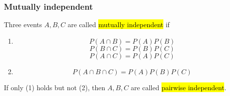 \documentclass[slidestop,compress,mathserif]{beamer}
\begin{document}
\begin{frame}\frametitle{Mutually independent}

\begin{dinglist}{\DingListSymbolA}
\item Three events $A, B, C$ are called \hl{mutually independent} if
\begin{enumerate}
\item \[P(A \cap B) = P(A) P(B)\]
\[P(B \cap C) = P(B) P(C)\]
\[P(A \cap C) = P(A) P(C)\]
\item \[P(A \cap B \cap C) = P(A) P(B) P(C)\]
\end{enumerate}

\pause
\item If only (1) holds but not (2), then $A, B, C$ are called \hl{pairwise independent}.

\end{dinglist}

\end{frame}
\end{document}
